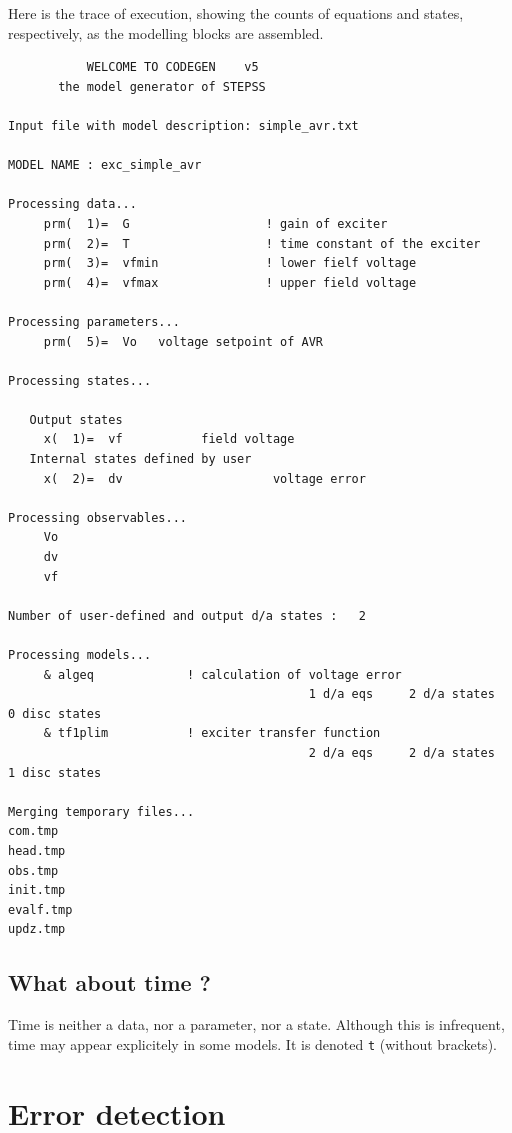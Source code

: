 Here is the trace of execution, showing the counts of equations and states, respectively, as the modelling blocks are assembled.

{\small
\begin{verbatim}
           WELCOME TO CODEGEN    v5
       the model generator of STEPSS

Input file with model description: simple_avr.txt

MODEL NAME : exc_simple_avr

Processing data...
     prm(  1)=  G                   ! gain of exciter
     prm(  2)=  T                   ! time constant of the exciter
     prm(  3)=  vfmin               ! lower fielf voltage
     prm(  4)=  vfmax               ! upper field voltage

Processing parameters...
     prm(  5)=  Vo   voltage setpoint of AVR

Processing states...

   Output states
     x(  1)=  vf           field voltage
   Internal states defined by user
     x(  2)=  dv                     voltage error

Processing observables...
     Vo
     dv
     vf

Number of user-defined and output d/a states :   2

Processing models...
     & algeq             ! calculation of voltage error
                                          1 d/a eqs     2 d/a states     0 disc states
     & tf1plim           ! exciter transfer function
                                          2 d/a eqs     2 d/a states     1 disc states

Merging temporary files...
com.tmp
head.tmp
obs.tmp
init.tmp
evalf.tmp
updz.tmp

\end{verbatim}
}

\subsection{What about time ?}

Time is neither a data, nor a parameter, nor a state. Although this is infrequent, time may appear explicitely in some models. It is denoted {\tt t} (without brackets).



\section{Error detection}

